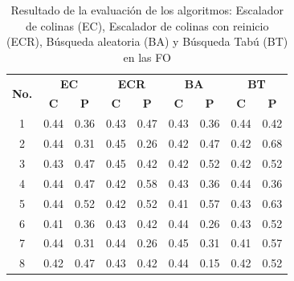 \begin{table}[H]
	\centering
	\caption{Resultado de la evaluación de los algoritmos: Escalador de colinas (EC), Escalador de colinas con reinicio (ECR), Búsqueda aleatoria (BA) y Búsqueda Tabú (BT) en las FO} \label{table:resultados-beisbol}
	\begin{tabular}{| c | c | c| c | c | c | c | c | c |}
		\toprule
		\multirow{2}{1cm}{\textbf{No.}} & \multicolumn{2}{c|}{\textbf{EC}} &          \multicolumn{2}{c|}{\textbf{ECR}}          & \multicolumn{2}{c|}{\textbf{BA}} & \multicolumn{2}{c|}{\textbf{BT}} \\
		\cmidrule{2-9}                  & \textbf{C} & \textbf{P}          & \textbf{C}               & \textbf{P}               & \textbf{C} & \textbf{P}          & \textbf{C} & \textbf{P}          \\ \midrule
		1                               & 0.44       & 0.36                & 0.43                     & 0.47                     & 0.43       & 0.36                & 0.44       & 0.42                \\ \hline
		2                               & 0.44       & 0.31                & 0.45                     & 0.26                     & 0.42       & 0.47                & 0.42       & 0.68                \\ \hline
		3                               & 0.43       & 0.47                & 0.45                     & 0.42                     & 0.42       & 0.52                & 0.42       & 0.52                \\ \hline
		4                               & 0.44       & 0.47                & 0.42                     & 0.58                     & 0.43       & 0.36                & 0.44       & 0.36                \\ \hline
		5                               & 0.44       & 0.52                & 0.42                     & 0.52                     & 0.41       & 0.57                & 0.43       & 0.63                \\ \hline
		6                               & 0.41       & 0.36                & 0.43                     & 0.42                     & 0.44       & 0.26                & 0.43       & 0.52                \\ \hline
		7                               & 0.44       & 0.31                & 0.44                     & 0.26                     & 0.45       & 0.31                & 0.41       & 0.57                \\ \hline
		8                               & 0.42       & 0.47                & 0.43                     & 0.42                     & 0.44       & 0.15                & 0.42       & 0.52                \\ \hline

\end{tabular}
\end{table}
